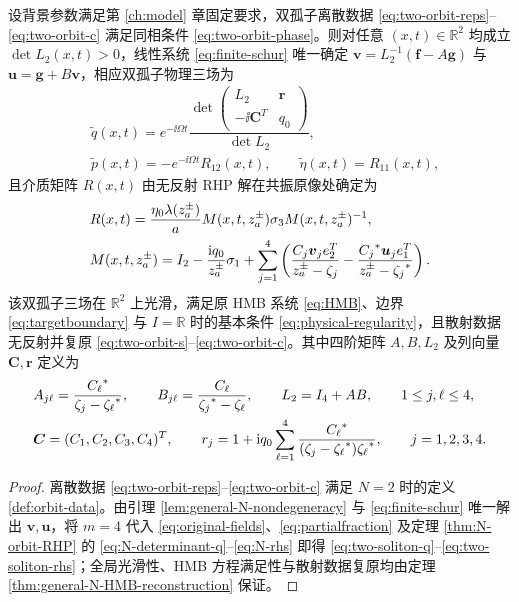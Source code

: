 \begin{theorem}\label{thm:two-soliton}
设背景参数满足第 \ref{ch:model} 章固定要求，双孤子离散数据 \eqref{eq:two-orbit-reps}--\eqref{eq:two-orbit-c} 满足同相条件 \eqref{eq:two-orbit-phase}。则对任意 $(x,t)\in\mathbb R^2$ 均成立 $\det L_2(x,t)>0$，线性系统 \eqref{eq:finite-schur} 唯一确定 $\boldsymbol v=L_2^{-1}(\boldsymbol f-A\boldsymbol g)$ 与 $\boldsymbol u=\boldsymbol g+B\boldsymbol v$，相应双孤子物理三场为
\begin{align}
&\widetilde q(x,t)=e^{-\ii\Omega t}
\dfrac{\det\begin{pmatrix}L_2&\boldsymbol r\\-\ii\boldsymbol C^T&q_0\end{pmatrix}}{\det L_2},\label{eq:two-soliton-q}\\
&\widetilde p(x,t)=-e^{-\ii\Omega t}R_{12}(x,t),\qquad
\widetilde\eta(x,t)=R_{11}(x,t),\label{eq:two-soliton-p-eta}
\end{align}
且介质矩阵 $R(x,t)$ 由无反射 RHP 解在共振原像处确定为
\begin{equation}\label{eq:two-soliton-R}
\begin{aligned}
&R(x,t)=\dfrac{\eta_0\lambda(z_a^\pm)}{a}M(x,t,z_a^\pm)\sigma_3 M(x,t,z_a^\pm)^{-1},\\
&M(x,t,z_a^\pm)=I_2-\dfrac{\mathrm{i} q_0}{z_a^\pm}\sigma_1
+\sum\limits_{j=1}^{4}\left(\dfrac{C_j\boldsymbol v_je_2^T}{z_a^\pm-\zeta_j}
-\dfrac{{C_j}^{*}\boldsymbol u_je_1^T}{z_a^\pm-{\zeta_j}^{*}}\right).
\end{aligned}
\end{equation}
该双孤子三场在 $\mathbb R^2$ 上光滑，满足原 HMB 系统 \eqref{eq:HMB}、边界 \eqref{eq:targetboundary} 与 $I=\mathbb R$ 时的基本条件 \eqref{eq:physical-regularity}，且散射数据无反射并复原 \eqref{eq:two-orbit-s}--\eqref{eq:two-orbit-c}。其中四阶矩阵 $A,B,L_2$ 及列向量 $\boldsymbol C,\boldsymbol r$ 定义为
\begin{equation}\label{eq:two-soliton-rhs}
\begin{aligned}
&A_{j\ell}=\dfrac{{C_\ell}^{*}}{\zeta_j-{\zeta_\ell}^{*}},\qquad
B_{j\ell}=\dfrac{C_\ell}{{\zeta_j}^{*}-\zeta_\ell},\qquad
L_2=I_4+AB,\qquad 1\le j,\ell\le4,\\
&\boldsymbol C=(C_1,C_2,C_3,C_4)^T,\qquad
r_j=1+\mathrm{i} q_0\sum\limits_{\ell=1}^{4}\dfrac{{C_\ell}^{*}}{(\zeta_j-{\zeta_\ell}^{*}){\zeta_\ell}^{*}},\qquad j=1,2,3,4.
\end{aligned}
\end{equation}
\end{theorem}
\begin{proof}
离散数据 \eqref{eq:two-orbit-reps}--\eqref{eq:two-orbit-c} 满足 $N=2$ 时的定义 \ref{def:orbit-data}。由引理 \ref{lem:general-N-nondegeneracy} 与 \eqref{eq:finite-schur} 唯一解出 $\boldsymbol v,\boldsymbol u$，将 $m=4$ 代入 \eqref{eq:original-fields}、\eqref{eq:partialfraction} 及定理 \ref{thm:N-orbit-RHP} 的 \eqref{eq:N-determinant-q}--\eqref{eq:N-rhs} 即得 \eqref{eq:two-soliton-q}--\eqref{eq:two-soliton-rhs}；全局光滑性、HMB 方程满足性与散射数据复原均由定理 \ref{thm:general-N-HMB-reconstruction} 保证。
\end{proof}

